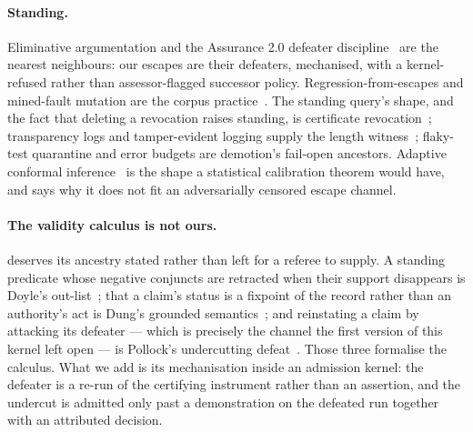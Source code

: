 \documentclass[11pt,a4paper]{article}
\theoremstyle{plain}
\theoremstyle{definition}
\theoremstyle{remark}
\begin{document}
\paragraph{Standing.} Eliminative argumentation and the Assurance 2.0 defeater discipline~\cite{goodenough,bloomfield} are the nearest neighbours: our escapes are their defeaters, mechanised, with a kernel-refused rather than assessor-flagged successor policy. Regression-from-escapes and mined-fault mutation are the corpus practice~\cite{tufano,beller}. The standing query's shape, and the fact that deleting a revocation raises standing, is certificate revocation~\cite{rfc5280,kocher,naor}; transparency logs and tamper-evident logging supply the length witness~\cite{laurie,crosby}; flaky-test quarantine and error budgets are demotion's fail-open ancestors. Adaptive conformal inference~\cite{gibbs} is the shape a statistical calibration theorem would have, and  says why it does not fit an adversarially censored escape channel.

\paragraph{The validity calculus is not ours.}  deserves its ancestry stated rather than left for a referee to supply. A standing predicate whose negative conjuncts are retracted when their support disappears is Doyle's out-list~\cite{doyle}; that a claim's status is a fixpoint of the record rather than an authority's act is Dung's grounded semantics~\cite{dung}; and reinstating a claim by attacking its defeater --- which is precisely the channel the first version of this kernel left open --- is Pollock's undercutting defeat~\cite{pollock}. Those three formalise the calculus. What we add is its mechanisation inside an admission kernel: the defeater is a re-run of the certifying instrument rather than an assertion, and the undercut is admitted only past a demonstration on the defeated run together with an attributed decision.
\end{document}
